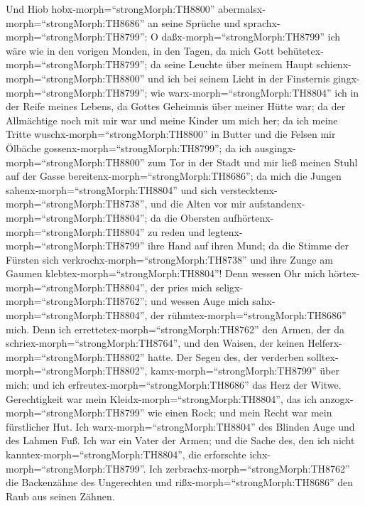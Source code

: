  Und Hiob hobx-morph=``strongMorph:TH8800''
abermalsx-morph=``strongMorph:TH8686'' an seine Sprüche und
sprachx-morph=``strongMorph:TH8799'':  O
daßx-morph=``strongMorph:TH8799'' ich wäre wie in den vorigen Monden, in
den Tagen, da mich Gott behütetex-morph=``strongMorph:TH8799'';
 da seine Leuchte über meinem Haupt
schienx-morph=``strongMorph:TH8800'' und ich bei seinem Licht in der
Finsternis gingx-morph=``strongMorph:TH8799'';  wie
warx-morph=``strongMorph:TH8804'' ich in der Reife meines Lebens, da
Gottes Geheimnis über meiner Hütte war;  da der Allmächtige
noch mit mir war und meine Kinder um mich her;  da ich meine
Tritte wuschx-morph=``strongMorph:TH8800'' in Butter und die Felsen mir
Ölbäche gossenx-morph=``strongMorph:TH8799'';  da ich
ausgingx-morph=``strongMorph:TH8800'' zum Tor in der Stadt und mir ließ
meinen Stuhl auf der Gasse bereitenx-morph=``strongMorph:TH8686'';
 da mich die Jungen sahenx-morph=``strongMorph:TH8804'' und
sich verstecktenx-morph=``strongMorph:TH8738'', und die Alten vor mir
aufstandenx-morph=``strongMorph:TH8804'';  da die Obersten
aufhörtenx-morph=``strongMorph:TH8804'' zu reden und
legtenx-morph=``strongMorph:TH8799'' ihre Hand auf ihren Mund;
 da die Stimme der Fürsten sich
verkrochx-morph=``strongMorph:TH8738'' und ihre Zunge am Gaumen
klebtex-morph=``strongMorph:TH8804''!  Denn wessen Ohr mich
hörtex-morph=``strongMorph:TH8804'', der pries mich
seligx-morph=``strongMorph:TH8762''; und wessen Auge mich
sahx-morph=``strongMorph:TH8804'', der
rühmtex-morph=``strongMorph:TH8686'' mich.  Denn ich
errettetex-morph=``strongMorph:TH8762'' den Armen, der da
schriex-morph=``strongMorph:TH8764'', und den Waisen, der keinen
Helferx-morph=``strongMorph:TH8802'' hatte.  Der Segen des,
der verderben solltex-morph=``strongMorph:TH8802'',
kamx-morph=``strongMorph:TH8799'' über mich; und ich
erfreutex-morph=``strongMorph:TH8686'' das Herz der Witwe. 
Gerechtigkeit war mein Kleidx-morph=``strongMorph:TH8804'', das ich
anzogx-morph=``strongMorph:TH8799'' wie einen Rock; und mein Recht war
mein fürstlicher Hut.  Ich
warx-morph=``strongMorph:TH8804'' des Blinden Auge und des Lahmen Fuß.
 Ich war ein Vater der Armen; und die Sache des, den ich
nicht kanntex-morph=``strongMorph:TH8804'', die erforschte
ichx-morph=``strongMorph:TH8799''.  Ich
zerbrachx-morph=``strongMorph:TH8762'' die Backenzähne des Ungerechten
und rißx-morph=``strongMorph:TH8686'' den Raub aus seinen Zähnen.
